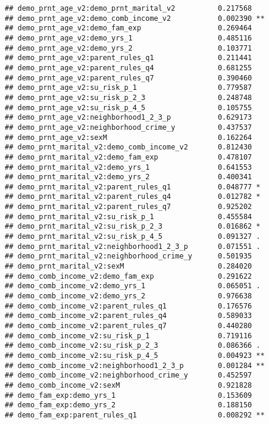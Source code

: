 \documentclass[
]{article}
\begin{document}
\begin{verbatim}
## demo_prnt_age_v2:demo_prnt_marital_v2          0.217568    
## demo_prnt_age_v2:demo_comb_income_v2           0.002390 ** 
## demo_prnt_age_v2:demo_fam_exp                  0.269464    
## demo_prnt_age_v2:demo_yrs_1                    0.485116    
## demo_prnt_age_v2:demo_yrs_2                    0.103771    
## demo_prnt_age_v2:parent_rules_q1               0.211441    
## demo_prnt_age_v2:parent_rules_q4               0.681255    
## demo_prnt_age_v2:parent_rules_q7               0.390460    
## demo_prnt_age_v2:su_risk_p_1                   0.779587    
## demo_prnt_age_v2:su_risk_p_2_3                 0.248748    
## demo_prnt_age_v2:su_risk_p_4_5                 0.105755    
## demo_prnt_age_v2:neighborhood1_2_3_p           0.629173    
## demo_prnt_age_v2:neighborhood_crime_y          0.437537    
## demo_prnt_age_v2:sexM                          0.162264    
## demo_prnt_marital_v2:demo_comb_income_v2       0.812430    
## demo_prnt_marital_v2:demo_fam_exp              0.478107    
## demo_prnt_marital_v2:demo_yrs_1                0.641553    
## demo_prnt_marital_v2:demo_yrs_2                0.400341    
## demo_prnt_marital_v2:parent_rules_q1           0.048777 *  
## demo_prnt_marital_v2:parent_rules_q4           0.012782 *  
## demo_prnt_marital_v2:parent_rules_q7           0.925202    
## demo_prnt_marital_v2:su_risk_p_1               0.455584    
## demo_prnt_marital_v2:su_risk_p_2_3             0.016862 *  
## demo_prnt_marital_v2:su_risk_p_4_5             0.091327 .  
## demo_prnt_marital_v2:neighborhood1_2_3_p       0.071551 .  
## demo_prnt_marital_v2:neighborhood_crime_y      0.501935    
## demo_prnt_marital_v2:sexM                      0.284020    
## demo_comb_income_v2:demo_fam_exp               0.291622    
## demo_comb_income_v2:demo_yrs_1                 0.065051 .  
## demo_comb_income_v2:demo_yrs_2                 0.976638    
## demo_comb_income_v2:parent_rules_q1            0.176576    
## demo_comb_income_v2:parent_rules_q4            0.589033    
## demo_comb_income_v2:parent_rules_q7            0.440280    
## demo_comb_income_v2:su_risk_p_1                0.719116    
## demo_comb_income_v2:su_risk_p_2_3              0.086366 .  
## demo_comb_income_v2:su_risk_p_4_5              0.004923 ** 
## demo_comb_income_v2:neighborhood1_2_3_p        0.001284 ** 
## demo_comb_income_v2:neighborhood_crime_y       0.452597    
## demo_comb_income_v2:sexM                       0.921828    
## demo_fam_exp:demo_yrs_1                        0.153609    
## demo_fam_exp:demo_yrs_2                        0.188150    
## demo_fam_exp:parent_rules_q1                   0.008292 ** 

\end{verbatim}
\end{document}
